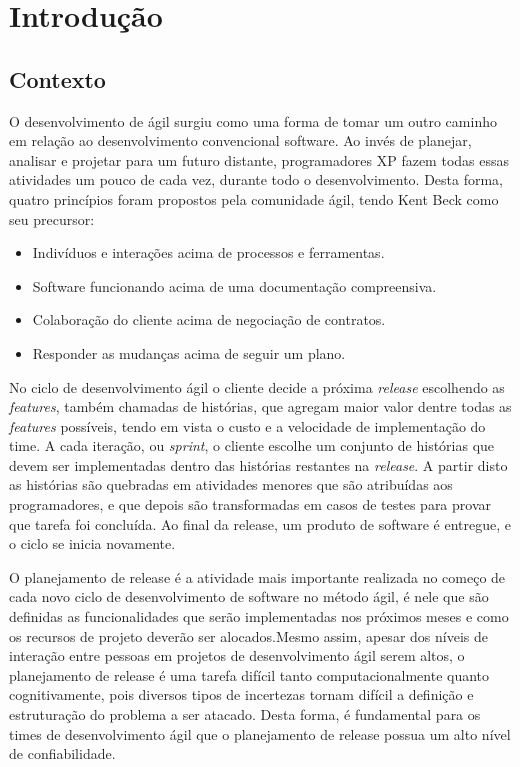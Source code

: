 \chapter{Introdução}
\section{Contexto}
O desenvolvimento de ágil surgiu como uma forma de tomar um outro
caminho em relação ao desenvolvimento convencional software. Ao invés de planejar,
analisar e projetar para um futuro distante, programadores XP fazem todas essas
atividades um pouco de cada vez, durante todo o desenvolvimento\cite{XP}.
Desta forma, quatro princípios foram propostos pela comunidade ágil, tendo Kent
Beck como seu precursor\cite{beckManifesto}:
\begin{itemize}
    \item Indivíduos e interações acima de processos e ferramentas.
    \item Software funcionando acima de uma documentação compreensiva.
    \item Colaboração do cliente acima de negociação de contratos.
    \item Responder as mudanças acima de seguir um plano.
\end{itemize}

No ciclo de desenvolvimento ágil o cliente decide a próxima \textit{release}
escolhendo as \textit{features}, também chamadas de histórias, que agregam
maior valor dentre todas as \textit{features} possíveis, tendo em vista  o custo
e a velocidade de implementação do time. A cada iteração, ou \textit{sprint}, o
cliente escolhe um conjunto de  histórias que devem ser implementadas dentro das
histórias restantes na \textit{release}. A partir disto as histórias são quebradas em
atividades menores que são atribuídas aos programadores, e que depois são
transformadas em casos de testes para provar que tarefa foi concluída\cite{XP}.
Ao final da release, um produto de software é entregue, e o ciclo se inicia
novamente.

O planejamento de release é a atividade mais importante realizada no começo de
cada novo ciclo de desenvolvimento de software no método ágil, é nele que são
definidas as funcionalidades que serão implementadas nos próximos meses e como
os recursos de projeto deverão ser alocados.Mesmo assim, apesar dos níveis de
interação entre pessoas em projetos de desenvolvimento ágil serem altos,
o planejamento de  release é uma tarefa difícil tanto computacionalmente quanto
cognitivamente, pois diversos tipos de incertezas tornam difícil a definição e
estruturação do problema a ser atacado\cite{Ngo}. Desta forma, é fundamental para
os times de desenvolvimento ágil que o planejamento de release possua um alto
nível de confiabilidade\cite{McDaid}.

